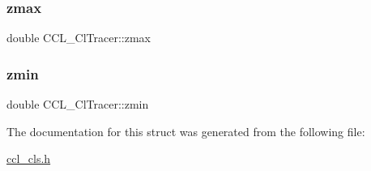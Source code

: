 \subsubsection{\texorpdfstring{zmax}{zmax}}
{\footnotesize\ttfamily double C\+C\+L\+\_\+\+Cl\+Tracer\+::zmax}

\mbox{\label{struct_c_c_l___cl_tracer_ae44938293ee360a536f3bfd2bb9570c4}} 
\subsubsection{\texorpdfstring{zmin}{zmin}}
{\footnotesize\ttfamily double C\+C\+L\+\_\+\+Cl\+Tracer\+::zmin}



The documentation for this struct was generated from the following file\+:\begin{DoxyCompactItemize}
\item 
\mbox{\hyperlink{ccl__cls_8h}{ccl\+\_\+cls.\+h}}\end{DoxyCompactItemize}
